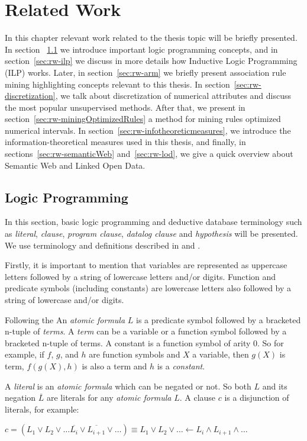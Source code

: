 \chapter{Related Work}
\label{sec:rw-intro}

In this chapter relevant work related to the thesis topic will be briefly presented. In section 
~\ref{sec:rw-lp} we introduce important logic programming concepts, and in section~\ref{sec:rw-ilp} we discuss in
more details how Inductive Logic Programming (ILP) works. Later, in section~\ref{sec:rw-arm} we briefly present
association rule mining highlighting concepts relevant to this thesis. In section~\ref{sec:rw-discretization}, we
talk about discretization of numerical attributes and discuss the most popular unsupervised methods. After that, we
present in section~\ref{sec:rw-miningOptimizedRules} a method for mining rules optimized numerical intervals. In
section~\ref{sec:rw-infotheoreticmeasures}, we introduce the information-theoretical measures used in this thesis,
and finally, in sections~\ref{sec:rw-semanticWeb} and~\ref{sec:rw-lod}, we give a quick overview about Semantic Web
and Linked Open Data.


\section{Logic Programming}
\label{sec:rw-lp}

In this section, basic logic programming and deductive database terminology such as \emph{literal}, \emph{clause},
\emph{program clause}, \emph{datalog clause} and \emph{hypothesis} will be presented. We use terminology and
definitions described in \citet{DBLP:books/sp/Lloyd87} and \citet{LavracDz94}.

Firstly, it is important to
mention that variables are represented as uppercase letters followed by a string of lowercase letters and/or digits.
Function and predicate symbols (including constants) are lowercase letters also followed by a string of lowercase and/or
digits.

Following the An \emph{atomic formula} $L$ is a predicate symbol followed by a bracketed n-tuple of \emph{terms}. A
\emph{term} can
be
a variable or a function symbol followed by a bracketed n-tuple of terms. A constant is a function symbol of arity 0.
So
for example, if $f$, $g$, and $h$ are function symbols and $X$ a variable, then $g(X)$ is term, $f(g(X),h)$ is also a
term and $h$ is a \emph{constant}.

A \emph{literal} is an \emph{atomic formula} which can be negated or not. So both $L$ and its negation $\overline{L}$
are literals for any \emph{atomic formula} $L$. A clause $c$ is a disjunction of literals, for example:
\begin{center}
  $c=(L_1 \vee L_2 \vee \ldots \overline{L_{i}} \vee \overline{L_{i+1}} \vee \ldots) \equiv
 L_1 \vee L_2 \vee \ldots \leftarrow L_i \wedge L_{i+1} \wedge \ldots$
\end{center}

